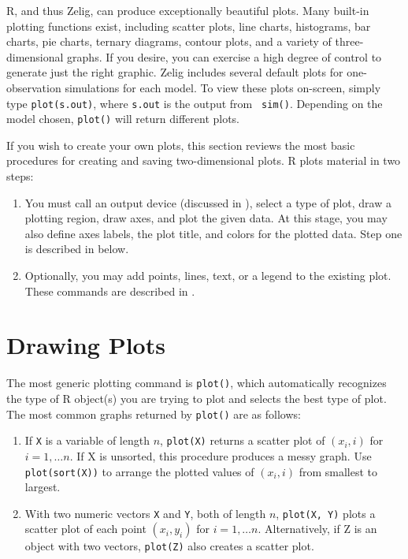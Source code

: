 R, and thus Zelig, can produce exceptionally beautiful plots.  Many
built-in plotting functions exist, including scatter plots, line
charts, histograms, bar charts, pie charts, ternary diagrams, contour
plots, and a variety of three-dimensional graphs.  If you desire, you
can exercise a high degree of control to generate just the right
graphic.  Zelig includes several default plots for one-observation
simulations for each model.  To view these plots on-screen, simply
type {\tt plot(s.out)}, where {\tt s.out} is the output from {\tt
  sim()}.  Depending on the model chosen, {\tt plot()} will return
different plots.

If you wish to create your own plots, this section reviews the most
basic procedures for creating and saving two-dimensional plots.  R
plots material in two steps:  
\begin{enumerate}
\item You must call an output device (discussed in ),
  select a type of plot, draw a plotting region, draw axes, and plot
  the given data.  At this stage, you may also define axes labels, the
  plot title, and colors for the plotted data.  Step one is described
  in  below.
\item Optionally, you may add points, lines, text, or a legend to the
  existing plot.  These commands are described in .
\end{enumerate}

\section{Drawing Plots}\label{ss:draw}

The most generic plotting command is \texttt{plot()}, which
automatically recognizes the type of R object(s) you are trying to
plot and selects the best type of plot.  The most common graphs
returned by \texttt{plot()} are as follows:
\begin{enumerate}
\item If \texttt{X} is a variable of length $n$, \texttt{plot(X)}
  returns a scatter plot of $(x_i, i)$ for $i = 1, \dots n$.  If X is
  unsorted, this procedure produces a messy graph.  Use
  \texttt{plot(sort(X))} to arrange the plotted values of $(x_i, i)$
  from smallest to largest.
\item With two numeric vectors \texttt{X} and \texttt{Y}, both of
  length $n$, \texttt{plot(X, Y)} plots a scatter plot of each point
  $(x_i, y_i)$ for $i = 1, \dots n$.  Alternatively, if Z is an object
  with two vectors, \texttt{plot(Z)} also creates a scatter plot.
\end{enumerate}

